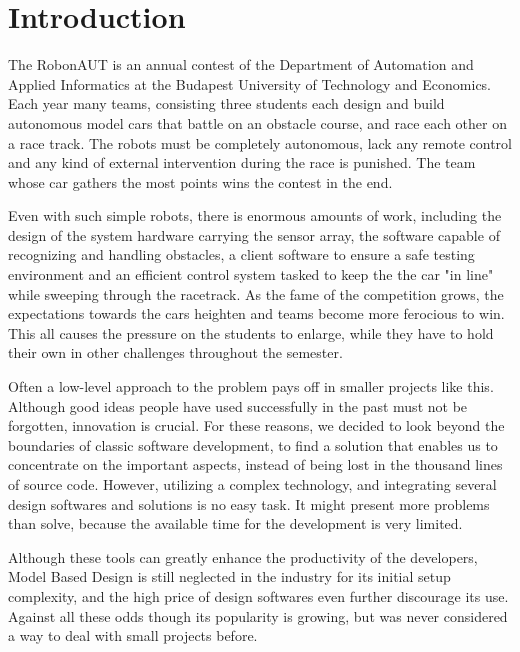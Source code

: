 \section{Introduction}
\label{sec:Introduction}


The RobonAUT is an annual contest of the Department of Automation and Applied Informatics at the Budapest University of Technology and Economics. Each year many teams, consisting three students each design and build autonomous model cars that battle on an obstacle course, and race each other on a race track. The robots must be completely autonomous, lack any remote control and any kind of external intervention during the race is punished. The team whose car gathers the most points wins the contest in the end\cite{rules}.


Even with such simple robots, there is enormous amounts of work, including the design of the system hardware carrying the sensor array, the software capable of recognizing and handling obstacles, a client software to ensure a safe testing environment and an efficient control system tasked to keep the the car "in line" while sweeping through the racetrack. As the fame of the competition grows, the expectations towards the cars heighten and teams become more ferocious to win. This all causes the pressure on the students to enlarge, while they have to hold their own in other challenges throughout the semester.


Often a low-level approach to the problem pays off in smaller projects like this. Although good ideas people have used successfully in the past must not be forgotten, innovation is crucial. For these reasons, we decided to look beyond the boundaries of classic software development, to find a solution that enables us to concentrate on the important aspects, instead of being lost in the thousand lines of source code. However, utilizing a complex technology, and integrating several design softwares and solutions is no easy task. It might present more problems than solve, because the available time for the development is very limited.


Although these tools can greatly enhance the productivity of the developers, Model Based Design is still neglected in the industry for its initial setup complexity, and the high price of design softwares even further discourage its use. Against all these odds though its popularity is growing, but was never considered a way to deal with small projects before.

